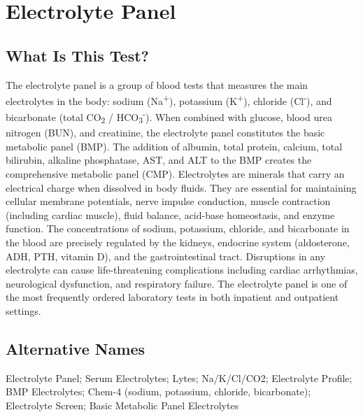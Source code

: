 \chapter{Electrolyte Panel}

\section*{What Is This Test?}
The electrolyte panel is a group of blood tests that measures the main electrolytes in the body: sodium (Na\textsuperscript{+}), potassium (K\textsuperscript{+}), chloride (Cl\textsuperscript{-}), and bicarbonate (total CO\textsubscript{2} / HCO\textsubscript{3}\textsuperscript{-}). When combined with glucose, blood urea nitrogen (BUN), and creatinine, the electrolyte panel constitutes the basic metabolic panel (BMP). The addition of albumin, total protein, calcium, total bilirubin, alkaline phosphatase, AST, and ALT to the BMP creates the comprehensive metabolic panel (CMP). Electrolytes are minerals that carry an electrical charge when dissolved in body fluids. They are essential for maintaining cellular membrane potentials, nerve impulse conduction, muscle contraction (including cardiac muscle), fluid balance, acid-base homeostasis, and enzyme function. The concentrations of sodium, potassium, chloride, and bicarbonate in the blood are precisely regulated by the kidneys, endocrine system (aldosterone, ADH, PTH, vitamin D), and the gastrointestinal tract. Disruptions in any electrolyte can cause life-threatening complications including cardiac arrhythmias, neurological dysfunction, and respiratory failure. The electrolyte panel is one of the most frequently ordered laboratory tests in both inpatient and outpatient settings.

\section*{Alternative Names}
Electrolyte Panel; Serum Electrolytes; Lytes; Na/K/Cl/CO2; Electrolyte Profile; BMP Electrolytes; Chem-4 (sodium, potassium, chloride, bicarbonate); Electrolyte Screen; Basic Metabolic Panel Electrolytes

